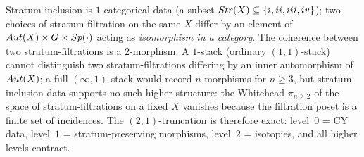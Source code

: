 \begin{remark}
\label{gluing:rem:2-1-truncation-justification}
Stratum-inclusion is $1$-categorical data (a subset $Str(X)\subseteq
\{i,ii,iii,iv\}$); two choices of stratum-filtration on the same $X$
differ by an element of $Aut(X)\times G\times Sp(\cdot)$ acting as
\emph{isomorphism in a category}. The coherence between two
stratum-filtrations is a $2$-morphism. A $1$-stack (ordinary
$(1,1)$-stack) cannot distinguish two stratum-filtrations differing by
an inner automorphism of $Aut(X)$; a full $(\infty,1)$-stack would
record $n$-morphisms for $n\geq 3$, but stratum-inclusion data
supports no such higher structure: the Whitehead $\pi_{n\geq 2}$ of
the space of stratum-filtrations on a fixed $X$ vanishes because the
filtration poset is a finite set of incidences. The $(2,1)$-truncation
is therefore exact: level~$0$ = CY data, level~$1$ = stratum-preserving
morphisms, level~$2$ = isotopies, and all higher levels contract.
\end{remark}

